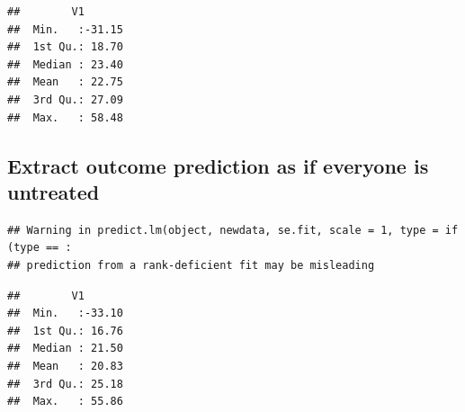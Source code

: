 \documentclass[
]{book}
\newenvironment{Shaded}{\begin{snugshade}}{\end{snugshade}}
\newcommand{\AttributeTok}[1]{\textcolor[rgb]{0.77,0.63,0.00}{#1}}
\newcommand{\DecValTok}[1]{\textcolor[rgb]{0.00,0.00,0.81}{#1}}
\newcommand{\FunctionTok}[1]{\textcolor[rgb]{0.00,0.00,0.00}{#1}}
\newcommand{\NormalTok}[1]{#1}
\newcommand{\OtherTok}[1]{\textcolor[rgb]{0.56,0.35,0.01}{#1}}
\newcommand{\SpecialCharTok}[1]{\textcolor[rgb]{0.00,0.00,0.00}{#1}}
\newcommand{\StringTok}[1]{\textcolor[rgb]{0.31,0.60,0.02}{#1}}
\begin{document}
\begin{Shaded}
\end{Shaded}

\begin{verbatim}
##        V1        
##  Min.   :-31.15  
##  1st Qu.: 18.70  
##  Median : 23.40  
##  Mean   : 22.75  
##  3rd Qu.: 27.09  
##  Max.   : 58.48
\end{verbatim}

\hypertarget{extract-outcome-prediction-as-if-everyone-is-untreated-2}{%
\subsection{Extract outcome prediction as if everyone is untreated}\label{extract-outcome-prediction-as-if-everyone-is-untreated-2}}

\begin{Shaded}
\end{Shaded}

\begin{verbatim}
## Warning in predict.lm(object, newdata, se.fit, scale = 1, type = if (type == :
## prediction from a rank-deficient fit may be misleading
\end{verbatim}

\begin{Shaded}
\end{Shaded}

\begin{verbatim}
##        V1        
##  Min.   :-33.10  
##  1st Qu.: 16.76  
##  Median : 21.50  
##  Mean   : 20.83  
##  3rd Qu.: 25.18  
##  Max.   : 55.86
\end{verbatim}
\end{document}
